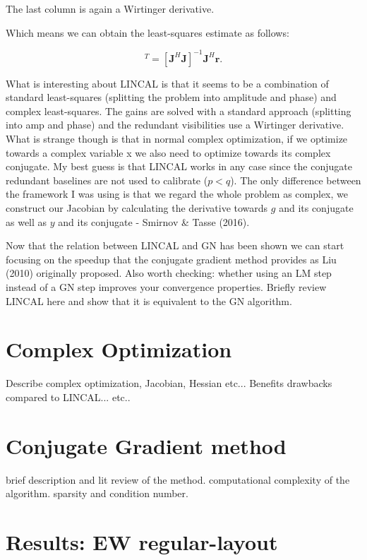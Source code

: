 \documentclass[a4paper,fleqn,usenatbib]{mnras}
\begin{document}
The last column is again a Wirtinger derivative.

Which means we can obtain the least-squares estimate as follows:

\begin{equation}
[\boldsymbol{\Delta \eta},\boldsymbol{\Delta \varphi},\boldsymbol{\Delta y}]^T = [\boldsymbol{J}^H\boldsymbol{J}]^{-1}\boldsymbol{J}^H\boldsymbol{r}.
\end{equation}

What is interesting about LINCAL is that it seems to be a combination of standard least-squares (splitting the problem into amplitude and phase) and 
complex least-squares. The gains are solved with a standard approach (splitting into amp and phase) and the redundant visibilities use a Wirtinger derivative. What is strange though is that in normal complex optimization, if we optimize towards a complex variable x we also need to optimize towards
its complex conjugate. My best guess is that LINCAL works in any case since the conjugate redundant baselines are not used to calibrate ($p<q$). The only difference between the framework I was using is that
we regard the whole problem as complex, we construct our Jacobian by calculating the derivative towards $g$ and its conjugate as well as $y$ and its conjugate - Smirnov \& Tasse (2016). 

Now that the relation between LINCAL and GN has been shown we can start focusing on the speedup that the conjugate gradient method provides as Liu (2010) originally proposed.
Also worth checking: whether using an LM step instead of a GN step improves your convergence properties.
Briefly review LINCAL here and show that it is equivalent to the GN algorithm.

\section{Complex Optimization}
Describe complex optimization, Jacobian, Hessian etc... Benefits drawbacks compared to LINCAL... etc..


\section{Conjugate Gradient method}
brief description and lit review of the method.
computational complexity of the algorithm.
sparsity and condition number.

\section{Results: EW regular-layout}
\end{document}
